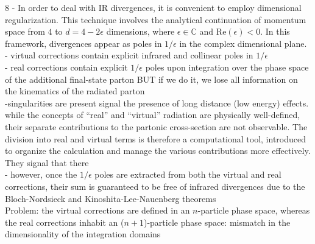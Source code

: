 \documentclass{article}
\begin{document}
8 - In order to deal with IR divergences, it is convenient to employ dimensional regularization. This technique involves the analytical continuation of momentum space from $4$ to $d=4-2\epsilon$ dimensions, where $\epsilon \in \mathbb{C}$ and $\mathrm{Re}(\epsilon)<0$. In this framework, divergences appear as poles in $1/\epsilon$ in the complex dimensional plane. \\
- virtual corrections contain explicit infrared and collinear poles in $1/\epsilon$ \\
- real corrections contain explicit $1/\epsilon$ poles upon integration over the phase space of the additional final-state parton BUT if we do it, we lose all information on the kinematics of the radiated parton \\
-singularities are present signal the presence of long distance (low energy) effects. while the concepts of “real” and “virtual” radiation are
physically well-defined, their separate contributions to the partonic cross-section are
not observable. The division into real and virtual terms is therefore a computational tool,
introduced to organize the calculation and manage the various contributions more effectively. They signal that there  \\
- however, once the $1/\epsilon$ poles are extracted from both the virtual and real corrections, their sum is guaranteed to be free of infrared divergences due to the Bloch-Nordsieck and Kinoshita-Lee-Nauenberg theorems \\
Problem: the virtual corrections are defined in an $n$-particle phase space, whereas the real corrections inhabit an ($n+1$)-particle phase space: mismatch in the dimensionality of the integration domains \\
\end{document}
